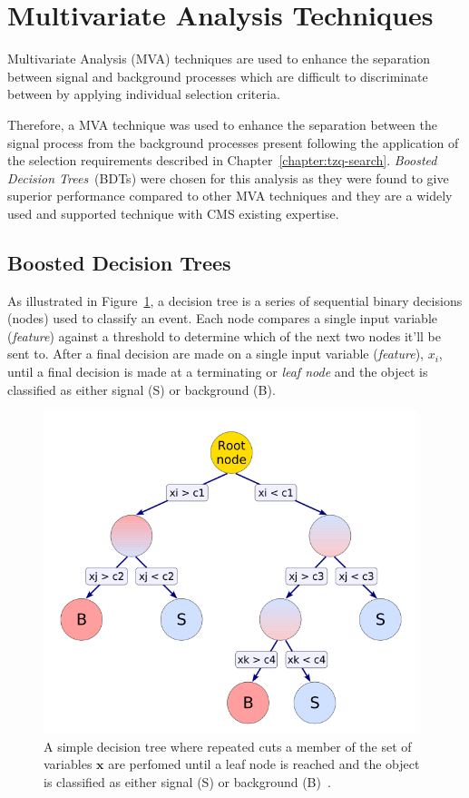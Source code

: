 \section{Multivariate Analysis Techniques}\label{sec:mvas}
Multivariate Analysis (MVA) techniques are used to enhance the separation between signal and background processes which are difficult to discriminate between by applying individual selection criteria.

Therefore, a MVA technique was used to enhance the separation between the signal process from the background processes present following the application of the selection requirements described in Chapter~\ref{chapter:tzq-search}.
\emph{Boosted Decision Trees}~(BDTs) were chosen for this analysis as they were found to give superior performance compared to other MVA techniques and they are a widely used and supported technique with CMS existing expertise.

\subsection{Boosted Decision Trees}\label{subsec:bdt}
As illustrated in Figure~\ref{fig:decisionTree}, a decision tree is a series of sequential binary decisions (nodes) used to classify an event.
Each node compares a single input variable (\emph{feature}) against a threshold to determine which of the next two nodes it'll be sent to.
After a final decision
 are made on a single input variable (\emph{feature}), $x_{i}$, until a final decision is made at a terminating or \emph{leaf node} and the object is classified as either signal (S) or background (B).

\begin{figure}[htb]
\centering
\includegraphics[width=0.97\textwidth]{figs/background-estimation/decisionTree.pdf}
\caption{A simple decision tree where repeated cuts a member of the set of variables $\textbf{x}$ are perfomed until a leaf node is reached and the object is classified as either signal (S) or background (B)~\cite{Hocker:2007ht}.
}
\label{fig:decisionTree}
\end{figure}

